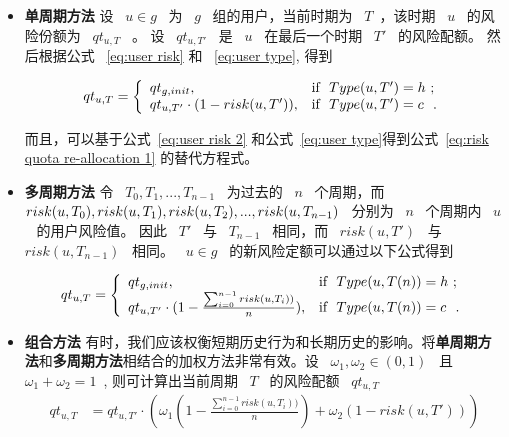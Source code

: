 \begin{itemize}
	\item \textbf{单周期方法} 设 ~$u \in g$~ 为 ~$g$~ 组的用户，当前时期为 ~$T$~，该时期 ~$u$~ 的风险份额为 ~$qt_{u,T}$~ 。 设 ~$qt_{u,T'}$~ 是 ~$u$~ 在最后一个时期 ~$T'$~ 的风险配额。
	然后根据公式 ~\ref{eq:user risk} 和 ~\ref{eq:user type}, 得到
	\begin{small}
		\begin{equation}\label{eq:risk quota re-allocation 1}
		qt_{u,T}=
		\left\{
		\begin{array}{ll}
		qt_{g,init}, & \hbox{if ~$Type(u,T')=h$~;} \\
		qt_{u,T'}\cdot (1-risk(u,T')), & \hbox{if ~$Type(u,T')=c~$~.} \\
		\end{array}
		\right.
		\end{equation}
	\end{small}
	而且，可以基于公式~\ref{eq:user risk 2} 和公式~\ref{eq:user type}得到公式~\ref{eq:risk quota re-allocation 1} 的替代方程式。
	\item \textbf{多周期方法} 令 ~$T_0,T_1,...,T_{n-1}$~ 为过去的 ~$n$~ 个周期，而 ~$risk(u,T_0),risk(u,T_1),risk(u,T_2),\\..., risk(u,T_{n-1})$~ 分别为 ~$n$~ 个周期内 ~$u$~ 的用户风险值。 因此 ~$T'$~ 与 ~$T_{n-1}$~ 相同，而 ~$risk(u,T')$~ 与 ~$risk(u,T_{n-1})$~ 相同。 ~$u \in g$~ 的新风险定额可以通过以下公式得到
	
	\begin{equation}\label{eq:risk quota re-allocation 2}
		qt_{u,T}=
		\left\{
		\begin{array}{ll}
		qt_{g,init}, & \hbox{if ~$Type(u,T(n))=h$~;} \\
		qt_{u,T'}\cdot (1-\frac{ \sum _{i=0} ^ {n-1}risk(u,T_i))}{n}), & \hbox{if ~$Type(u,T(n))=c~$~.} \\
		\end{array}
		\right.
		\end{equation}
	
	\item \textbf{组合方法} 有时，我们应该权衡短期历史行为和长期历史的影响。将\textbf{单周期方法}和\textbf{多周期方法}相结合的加权方法非常有效。设 ~$\omega_1, \omega_2 \in (0,1)$~ 且 ~$\omega_1+ \omega_2 =1$~, 则可计算出当前周期 ~$T$~ 的风险配额 ~$qt_{u,T}$~ 
	\begin{equation}\label{eq:risk quota re-allocation 3}
	\begin{aligned}
	qt_{u,T} &= qt_{u,T'}\cdot (\omega_1(1-\frac{ \sum _{i=0} ^ {n-1}risk(u,T_i))}{n}) + \omega_2(1-risk(u,T')))
	\end{aligned}
	\end{equation}
\end{itemize}

